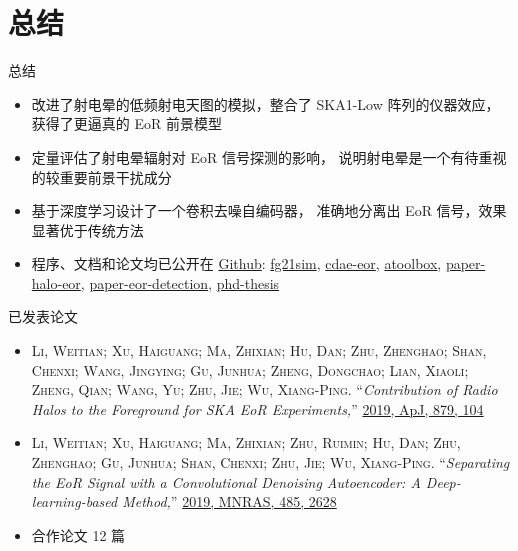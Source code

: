 \documentclass{beamer}
\begin{document}
\section{总结}

\begin{frame}{总\cspace{}结}
  \begin{itemize}
    \item 改进了射电晕的低频射电天图的模拟，整合了 SKA1-Low 阵列的仪器效应，
      获得了更逼真的 EoR 前景模型
    \item 定量评估了射电晕辐射对 EoR 信号探测的影响，
      说明射电晕是一个有待重视的较重要前景干扰成分
    \item 基于深度学习设计了一个卷积去噪自编码器，
      准确地分离出 EoR 信号，效果显著优于传统方法
    \item 程序、文档和论文均已公开在
      \href{https://github.com/liweitianux/}{Github}:
      \href{https://github.com/liweitianux/fg21sim}{fg21sim},
      \href{https://github.com/liweitianux/cdae-eor}{cdae-eor},
      \href{https://github.com/liweitianux/atoolbox}{atoolbox},
      \href{https://github.com/liweitianux/paper-halo-eor}{paper-halo-eor},
      \href{https://github.com/liweitianux/paper-eor-detection}{paper-eor-detection},
      \href{https://github.com/liweitianux/phd-thesis}{phd-thesis}
  \end{itemize}
\end{frame}

\begin{frame}{已发表论文}
  \small
  \begin{itemize}
    \item
      \textsc{\alert{Li, Weitian}; Xu, Haiguang; Ma, Zhixian; Hu, Dan;
      Zhu, Zhenghao; Shan, Chenxi; Wang, Jingying; Gu, Junhua;
      Zheng, Dongchao; Lian, Xiaoli; Zheng, Qian; Wang, Yu;
      Zhu, Jie; Wu, Xiang-Ping}.
      \enquote{\it Contribution of Radio Halos to the Foreground for
        SKA EoR Experiments,}
      \href{http://adsabs.harvard.edu/abs/2019ApJ...879..104L}{%
        2019, ApJ, 879, 104}
    \item
      \textsc{\alert{Li, Weitian}; Xu, Haiguang; Ma, Zhixian; Zhu, Ruimin;
      Hu, Dan; Zhu, Zhenghao; Gu, Junhua; Shan, Chenxi; Zhu, Jie;
      Wu, Xiang-Ping}.
      \enquote{\it Separating the EoR Signal with a Convolutional Denoising
        Autoencoder: A Deep-learning-based Method,}
      \href{http://adsabs.harvard.edu/abs/2019MNRAS.485.2628L}{%
        2019, MNRAS, 485, 2628}
    \item
      合作论文 12 篇
  \end{itemize}
\end{frame}
\end{document}
